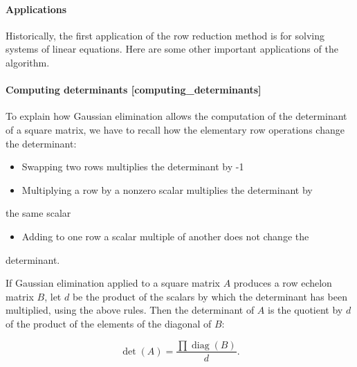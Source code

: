 \paragraph{Applications}

Historically, the first application of the row reduction method is for
solving systems of linear equations. Here are some other important
applications of the algorithm.

\paragraph{Computing determinants [computing\_determinants]}

To explain how Gaussian elimination allows the computation of the
determinant of a square matrix, we have to recall how the elementary row
operations change the determinant:

\begin{itemize}
    \item Swapping two rows multiplies the determinant by -1
    \item Multiplying a row by a nonzero scalar multiplies the determinant by
\end{itemize}
    the same scalar
\begin{itemize}
    \item Adding to one row a scalar multiple of another does not change the
\end{itemize}
    determinant.

If Gaussian elimination applied to a square matrix
$A$ produces a row echelon matrix
$B$, let $d$ be the product of
the scalars by which the determinant has been multiplied, using the
above rules. Then the determinant of $A$ is the
quotient by $d$ of the product of the elements of
the diagonal of $B$:

$$\det(A) = \frac{\prod\operatorname{diag}(B)}{d}.$$

